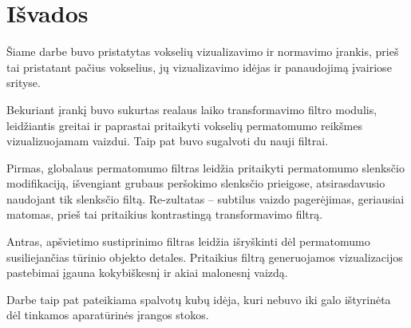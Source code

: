 \section{Išvados}

Šiame darbe buvo pristatytas vokselių vizualizavimo ir normavimo įrankis,
prieš tai pristatant pačius vokselius, jų vizualizavimo idėjas ir panaudojimą
įvairiose srityse.

Bekuriant įrankį buvo sukurtas realaus laiko transformavimo filtro modulis,
leidžiantis greitai ir paprastai pritaikyti vokselių permatomumo reikšmes
vizualizuojamam vaizdui. Taip pat buvo sugalvoti du nauji filtrai.

Pirmas, globalaus permatomumo filtras leidžia pritaikyti permatomumo slenksčio
modifikaciją, išvengiant grubaus peršokimo slenksčio prieigose, atsirasdavusio
naudojant tik slenksčio filtą. Re-zultatas -- subtilus vaizdo pagerėjimas,
geriausiai matomas, prieš tai pritaikius kontrastingą transformavimo filtrą.

Antras, apšvietimo sustiprinimo filtras leidžia išryškinti dėl permatomumo
susiliejančias tūrinio objekto detales. Pritaikius filtrą generuojamos
vizualizacijos pastebimai įgauna kokybiškesnį ir akiai malonesnį vaizdą.

Darbe taip pat pateikiama spalvotų kubų idėja, kuri nebuvo iki galo ištyrinėta
dėl tinkamos aparatūrinės įrangos stokos.

